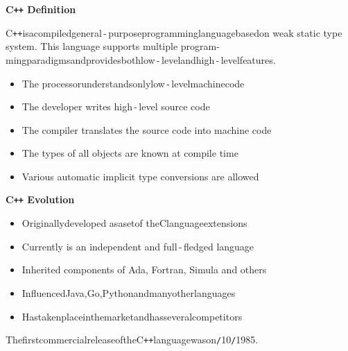 \documentclass{beamer}
\begin{document}
\begin{frame}{\bf C\texttt{++} Definition}

    \begin{block}
    \justifying C\texttt{++}\;is\;a\;compiled\:general\,-\,purpose\:programming\:language\;based\:on weak static type system. This language supports multiple program- ming\:paradigms\:and\:provides\:both\:low\,-\,level\:and\:high\,-\,level\:features.
    \end{block}

    \begin{itemize}

        \item The processor\;understands\;only\;low\,-\,level\;machine\;code

        \item The developer writes high\,-\,level source code

        \item The compiler translates the source code into machine code

        \item The types of all objects are known at compile time

        \item Various automatic implicit type conversions are allowed
        
    \end{itemize}
    
\end{frame}

\begin{frame}{\bf C\texttt{++} Evolution}
    
    \begin{itemize}

        \item Originally\;developed as\;a\;set\;of the\;C\;language\;extensions

        \item Currently is an independent and full\,-\,fledged language

        \item Inherited components of Ada, Fortran, Simula and others

        \item Influenced\;Java,\:Go,\:Python\;and\;many\;other\;languages

        \item Has\;taken\;place\;in\;the\;market\;and\;has\;several\;competitors
         
    \end{itemize}

    \begin{block}
    \justifying The\:first\:commercial\:release\:of\:the\:C\texttt{++}\:language\:was\:on\texttt{/}10\texttt{/}1985.
    \end{block}
    
\end{frame}
\end{document}
